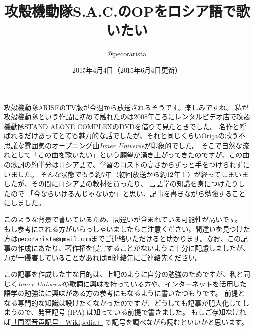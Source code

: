 \documentclass[12pt]{ltjsarticle}
\title{攻殻機動隊S.A.C.のOPをロシア語で歌いたい}
\author{@pecorarista}
\date{2015年4月4日（2015年6月4日更新）}
\begin{document}
\maketitle
攻殻機動隊ARISEのTV版が今週から放送されるそうです。楽しみですね。
私が攻殻機動隊という作品に初めて触れたのは2008年ころにレンタルビデオ店で攻殻機動隊STAND ALONE COMPLEXのDVDを借りて見たときでした。
名作と呼ばれるだけあってとても魅力的な話でしたが、それと同じくらいOrigaの歌う不思議な雰囲気のオープニング曲\textit{Inner Universe}\nocite{origa2011}が印象的でした。
そこで自然な流れとして「この曲を歌いたい」という願望が湧き上がってきたのですが、この曲の歌詞の約半分はロシア語で、学習のコストの高さからずっと手をつけられずにいました。
そんな状態でもう約7年（初回放送から約12年！）が経ってしまいましたが、その間にロシア語の教材を買ったり、
言語学の知識を身につけたりしたので 「今ならいけるんじゃないか」と思い、記事を書きながら勉強することにしました。

このような背景で書いているため、間違いが含まれている可能性が高いです。
もし参考にされる方がいらっしゃいましたらご注意ください。間違いを見つけた方は\texttt{pecorarista@gmail.com}までご連絡いただけると助かります。なお、この記事の作成にあたり、著作権を侵害することがないように十分に配慮しましたが、万が一侵害していることがあれば同連絡先にご連絡先ください。

この記事を作成した主な目的は、上記のように自分の勉強のためですが、私と同じく\textit{Inner Universe}の歌詞に興味を持っている方や、インターネットを活用した語学の勉強法に興味がある方の参考にもなるように書いたつもりです。
前提となる専門的な知識は設けたくなかったのですが、どうしても記事が肥大化してしまうので、発音記号 (IPA) は知っている前提で書きました。
もしご存知なければ\href{http://ja.wikipedia.org/wiki/%E5%9B%BD%E9%9A%9B%E9%9F%B3%E5%A3%B0%E8%A8%98%E5%8F%B7}{「国際音声記号 - Wikipedia」}
で記号を調べながら読むといいかと思います。
\end{document}
